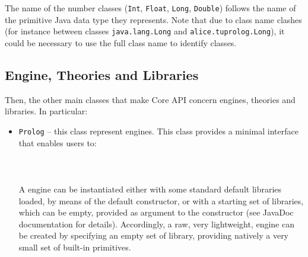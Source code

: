 %
\noindent The name of the \tuprolog{} number classes
(\texttt{Int}, \texttt{Float}, \texttt{Long}, \texttt{Double})
follows the name of the primitive Java data type they represents.
%
Note that due to class name clashes (for instance between classes
\texttt{java.lang.Long} and \texttt{alice.tuprolog.Long}), it
could be necessary to use the full class name to identify
\tuprolog{} classes.
%

\subsection{Engine, Theories and Libraries}

\noindent Then, the other main classes that make \tuprolog{} Core
API concern \tuprolog{} engines, theories and libraries. In
particular:
%
\begin{itemize}
    \item \texttt{Prolog} -- this class represent \tuprolog{}
    engines.
    This class provides a minimal interface that enables users
    to: \\
    \\
     \\
    \\
    A \tuprolog{} engine can be instantiated either with some standard default
    libraries loaded, by means of the default constructor, or with
    a starting set of libraries, which can be empty, provided as
    argument to the constructor (see JavaDoc documentation for
    details).
    Accordingly, a raw, very lightweight, \tuprolog{} engine can
    be created by specifying an empty set of library, providing
    natively a very small set of built-in primitives.



\end{itemize}
